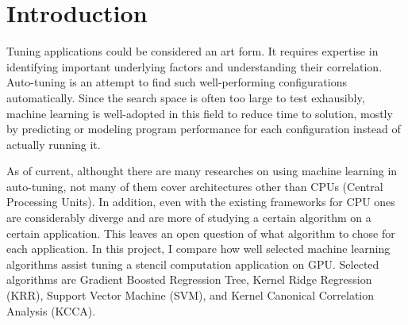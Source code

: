 \section{Introduction} %

Tuning applications could be considered an art form. It requires expertise in identifying important underlying factors and understanding their correlation. Auto-tuning is an attempt to find such well-performing configurations automatically. Since the search space is often too large to test exhausibly, machine learning is well-adopted in this field to reduce time to solution, mostly by predicting or modeling program performance for each configuration instead of actually running it.

As of current, althought there are many researches on using machine learning in auto-tuning, not many of them cover architectures other than CPUs (Central Processing Units). In addition, even with the existing frameworks for CPU ones are considerably diverge and are more of studying a certain algorithm on a certain application. This leaves an open question of what algorithm to chose for each application. In this project, I compare how well selected machine learning algorithms assist tuning a stencil computation application on GPU. Selected algorithms are Gradient Boosted Regression Tree, Kernel Ridge Regression (KRR), Support Vector Machine (SVM), and Kernel Canonical Correlation Analysis (KCCA).

